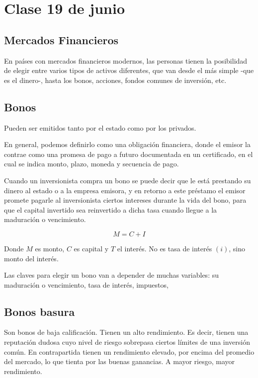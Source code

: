 \section{Clase 19 de junio}

\subsection{Mercados Financieros}

En países con mercados financieros modernos, las personas tienen la posibilidad
de elegir entre varios tipos de activos diferentes, que van desde el más simple
-que es el dinero-, hasta los bonos, acciones, fondos comunes de inversión,
etc.

\subsection{Bonos}

Pueden ser emitidos tanto por el estado como por los privados.

En general, podemos definirlo como una obligación financiera, donde el emisor
la contrae como una promesa de pago a futuro documentada en un certificado, en
el cual se indica monto, plazo, moneda y secuencia de pago.

Cuando un inversionista compra un bono se puede decir que le está prestando su
dinero al estado o a la empresa emisora, y en retorno a este préstamo el emisor
promete pagarle al inversionista ciertos intereses durante la vida del bono,
para que el capital invertido sea reinvertido a dicha tasa cuando llegue a la
maduración o vencimiento.

\begin{equation*}
    M = C + I
\end{equation*}

Donde $M$ es monto,
$C$ es capital 
y $T$ el interés.
No es tasa de interés $(i)$,
sino monto del interés.

Las claves para elegir un bono van a depender de muchas variables:
su maduración o vencimiento, tasa de interés, impuestos, 

\subsection{Bonos basura}

Son bonos de baja calificación. Tienen un alto rendimiento. Es decir, tienen
una reputación dudosa cuyo nivel de riesgo sobrepasa ciertos límites de una
inversión común. En contrapartida tienen un rendimiento elevado, por encima del
promedio del mercado, lo que tienta por las buenas ganancias. A mayor riesgo,
mayor rendimiento.

